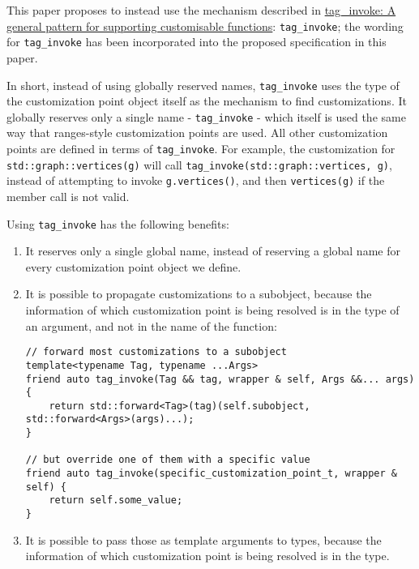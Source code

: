 \documentclass[10pt,onecolumn]{article}
\newcommand{\tcode}[1]{\lstinline[breaklines=true]{#1}}
\begin{document}
This paper proposes to instead use the mechanism described in \href{https://www.open-std.org/jtc1/sc22/wg21/docs/papers/2019/p1895r0.pdf}{tag\_invoke: A general pattern for supporting customisable functions}:
\tcode{tag_invoke}; the wording for \tcode{tag_invoke} has been incorporated into the proposed specification in this paper.

In short, instead of using globally reserved names, \tcode{tag_invoke} uses the type of the customization point object itself as the mechanism to find customizations. 
It globally reserves only a single name - \tcode{tag_invoke} - which itself is used the same way that ranges-style customization points are used. All other customization 
points are defined in terms of \tcode{tag_invoke}. For example, the customization for \tcode{std::graph::vertices(g)} will call 
\tcode{tag_invoke(std::graph::vertices, g)}, instead of attempting to invoke \tcode{g.vertices()}, and then \tcode{vertices(g)} if the member call is not valid.

Using \tcode{tag_invoke} has the following benefits:

\begin{enumerate}
\item It reserves only a single global name, instead of reserving a global name for every customization point object we define.

\item It is possible to propagate customizations to a subobject, because the information of which customization point is being resolved is in the type of an argument, and not in the name of the function:

\begin{lstlisting}
// forward most customizations to a subobject
template<typename Tag, typename ...Args>
friend auto tag_invoke(Tag && tag, wrapper & self, Args &&... args) {
    return std::forward<Tag>(tag)(self.subobject, std::forward<Args>(args)...);
}

// but override one of them with a specific value
friend auto tag_invoke(specific_customization_point_t, wrapper & self) {
    return self.some_value;
}
\end{lstlisting}

\item It is possible to pass those as template arguments to types, because the information of which customization point is being resolved is in the type. 

\end{enumerate}
\end{document}
